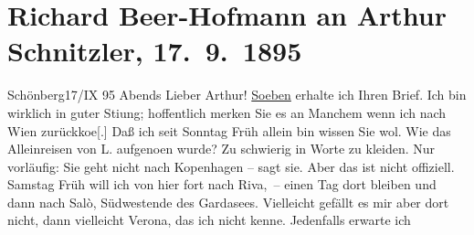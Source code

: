 

         
         \renewcommand{\erwaehntePersonen}{Personen: Lou Andreas-Salomé, Leo Ebermann, Johann Wolfgang von Goethe, Hugo von Hofmannsthal, Paul Horn, Felix Salten, Ludwig Speidel}
         \renewcommand{\erwaehnteInstitutionen}{Institutionen: Bibliographisches Institut}
         \renewcommand{\erwaehnteOrte}{Orte: Brenner, Gasthaus Jagerhof, Kopenhagen, Lago di Garda, Riva del Garda, Salò, Schönberg im Stubaital, Verona, Wien}
         \renewcommand{\erwaehnteWerke}{Werke: Deutsche Alpen, Italienische Reise, Liebelei. Schauspiel in drei Akten, Meyers Reisebücher}
               \section[Richard Beer-Hofmann an Arthur Schnitzler, 17. 9. 1895]{ Richard Beer-Hofmann an Arthur Schnitzler, 17. 9. 1895}\nopagebreak{}\rehead{ }\begin{ledgroupsized}[t]{13cm}\normalsize\beginnumbering \toendnotes[C]{\smallbreak\pagebreak[2]} 
\toendnotes[C]{\smallbreak}\pstart
           \raggedleft{}{\pb}Schönberg17/IX 95{ }Abends\pend
           \pstart
           Lieber Arthur! \uline{Soeben} erhalte ich Ihren Brief. Ich bin wirklich in
               guter Sti{\geminationm}ung; hoffentlich merken Sie es an Manchem wenn
               ich nach Wien zurückko{\geminationm}e{[}.{]} Daß ich seit Sonntag{ }Früh allein bin wissen Sie wol. Wie das Alleinreisen von L. aufgeno{\geminationm}en wurde?
               Zu schwierig in Worte zu kleiden. Nur vorläufig: Sie geht nicht nach Kopenhagen – sagt sie. Aber das ist nicht offiziell. Samstag{ }\introOben{}Früh\introOben{} will ich von {\pb}hier fort nach
                  Riva, – einen Tag dort bleiben und dann nach Salò, Südwestende des Gardasees. Vielleicht gefällt es mir aber dort nicht, dann vielleicht Verona, das ich nicht kenne. Jedenfalls erwarte ich

\end{ledgroupsized}
